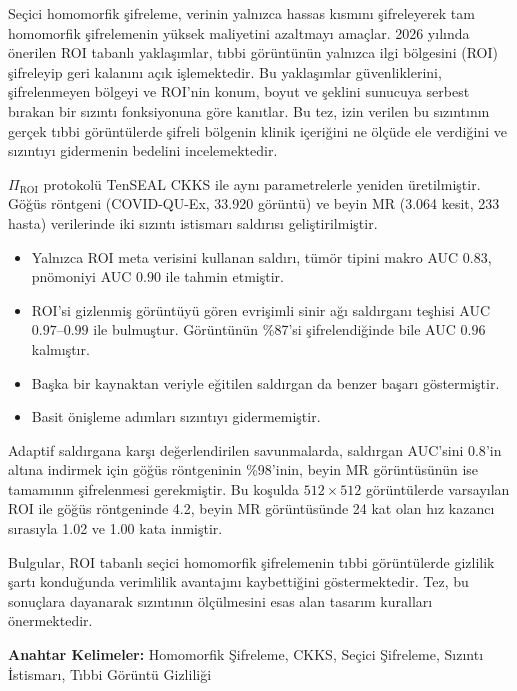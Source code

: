 Seçici homomorfik şifreleme, verinin yalnızca hassas kısmını şifreleyerek tam homomorfik şifrelemenin yüksek maliyetini azaltmayı amaçlar. 2026 yılında önerilen ROI tabanlı yaklaşımlar, tıbbi görüntünün yalnızca ilgi bölgesini (ROI) şifreleyip geri kalanını açık işlemektedir. Bu yaklaşımlar güvenliklerini, şifrelenmeyen bölgeyi ve ROI'nin konum, boyut ve şeklini sunucuya serbest bırakan bir sızıntı fonksiyonuna göre kanıtlar. Bu tez, izin verilen bu sızıntının gerçek tıbbi görüntülerde şifreli bölgenin klinik içeriğini ne ölçüde ele verdiğini ve sızıntıyı gidermenin bedelini incelemektedir.

$\Pi_{\mathrm{ROI}}$ protokolü TenSEAL CKKS ile aynı parametrelerle yeniden üretilmiştir. Göğüs röntgeni (COVID-QU-Ex, 33.920 görüntü) ve beyin MR (3.064 kesit, 233 hasta) verilerinde iki sızıntı istismarı saldırısı geliştirilmiştir.
\begin{itemize}
\item Yalnızca ROI meta verisini kullanan saldırı, tümör tipini makro AUC $0.83$, pnömoniyi AUC $0.90$ ile tahmin etmiştir.
\item ROI'si gizlenmiş görüntüyü gören evrişimli sinir ağı saldırganı teşhisi AUC $0.97$--$0.99$ ile bulmuştur. Görüntünün \%87'si şifrelendiğinde bile AUC $0.96$ kalmıştır.
\item Başka bir kaynaktan veriyle eğitilen saldırgan da benzer başarı göstermiştir.
\item Basit önişleme adımları sızıntıyı gidermemiştir.
\end{itemize}

Adaptif saldırgana karşı değerlendirilen savunmalarda, saldırgan AUC'sini $0.8$'in altına indirmek için göğüs röntgeninin \%98'inin, beyin MR görüntüsünün ise tamamının şifrelenmesi gerekmiştir. Bu koşulda $512 \times 512$ görüntülerde varsayılan ROI ile göğüs röntgeninde 4.2, beyin MR görüntüsünde 24 kat olan hız kazancı sırasıyla 1.02 ve 1.00 kata inmiştir.

Bulgular, ROI tabanlı seçici homomorfik şifrelemenin tıbbi görüntülerde gizlilik şartı konduğunda verimlilik avantajını kaybettiğini göstermektedir. Tez, bu sonuçlara dayanarak sızıntının ölçülmesini esas alan tasarım kuralları önermektedir.

\textbf{Anahtar Kelimeler:} Homomorfik Şifreleme, CKKS, Seçici Şifreleme, Sızıntı İstismarı, Tıbbi Görüntü Gizliliği
